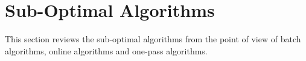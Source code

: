 \newtheorem{theorem}{Theorem}
\newtheorem{lemma}{Lemma}

\vspace{-1ex}
\section{Sub-Optimal Algorithms}
\label{sec-subopt}



This section reviews the sub-optimal \lsa algorithms from the point of view of batch algorithms, online algorithms and one-pass algorithms.









